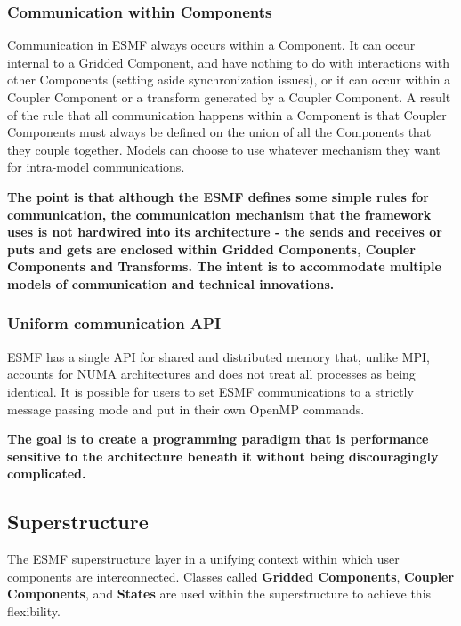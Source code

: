 \subsubsection{Communication within Components}
Communication in ESMF always occurs within a Component.  It
can occur internal to a Gridded Component, and have nothing to do 
with interactions with other Components (setting aside 
synchronization issues), or it can occur within a Coupler Component
or a transform generated by a Coupler Component.  A result of the rule 
that all communication happens within a Component is that 
Coupler Components must always be defined on the union of all the
Components that they couple together.  Models can choose to 
use whatever mechanism they want for intra-model communications.  

{\bf The point is that although the ESMF defines some simple rules 
for communication, the communication mechanism that the 
framework uses is not hardwired into its architecture -
the sends and receives or puts and gets are enclosed within 
Gridded Components, Coupler Components and Transforms. The intent
is to accommodate multiple models of communication and technical 
innovations.}

\subsubsection{Uniform communication API}
ESMF has a single API for shared and distributed
memory that, unlike MPI, accounts for NUMA architectures and 
does not treat all processes as being identical.  It is possible for
users to set ESMF communications to a strictly message passing 
mode and put in their own OpenMP commands.

{\bf The goal is to create a programming paradigm 
that is performance sensitive to the architecture beneath it 
without being discouragingly complicated.}

\subsection{Superstructure}
\label{sec:superstructure}
The ESMF superstructure layer in a unifying context within which user 
components are interconnected. Classes called {\bf Gridded Components}, 
{\bf Coupler Components}, and {\bf States} are used within the superstructure 
to achieve this flexibility.

